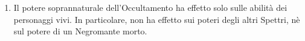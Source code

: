 \documentclass[a4paper,10pt]{article}
\begin{document}
\begin{enumerate}
% 
%
%	
% 
	
	\item Il potere soprannaturale dell'Occultamento ha effetto solo sulle abilità dei personaggi vivi. In particolare, non ha effetto sui poteri degli altri Spettri, nè sul potere di un Negromante morto.
	
	

\end{enumerate}
\end{document}
